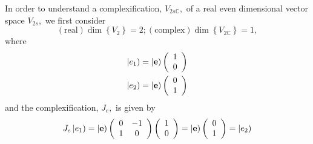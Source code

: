 \documentclass[aps,preprint]{revtex4}%
\begin{document}
In order to understand a complexification, $V_{2s\mathbb{C}},$ of a real even
dimensional vector space $V_{2s},$ we first consider
\begin{equation}
\left(  \text{real}\right)  \dim\left\{  V_{2}\right\}  =2;\left(
\text{complex}\right)  \dim\left\{  V_{2\mathbb{C}}\right\}  =1,
\end{equation}
where
\begin{align}
\left\vert e_{1}\right)   &  =\left\vert \mathbf{e}\right)  \left(
\begin{array}
[c]{c}%
1\\
0
\end{array}
\right) \\
\left\vert e_{2}\right)   &  =\left\vert \mathbf{e}\right)  \left(
\begin{array}
[c]{c}%
0\\
1
\end{array}
\right)
\end{align}
and the complexification, $J_{e},$ is given by%
\begin{equation}
J_{e}\left\vert e_{1}\right)  =\left\vert \mathbf{e}\right)  \left(
\begin{array}
[c]{cc}%
0 & -1\\
1 & 0
\end{array}
\right)  \left(
\begin{array}
[c]{c}%
1\\
0
\end{array}
\right)  =\left\vert \mathbf{e}\right)  \left(
\begin{array}
[c]{c}%
0\\
1
\end{array}
\right)  =\left\vert e_{2}\right)
\end{equation}
%
\end{document}

